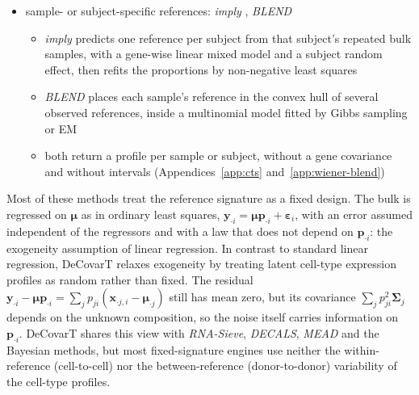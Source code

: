 \documentclass[pdflatex, sn-nature]{sn-jnl}
\theoremstyle{thmstyleone}%
\theoremstyle{thmstyletwo}%
\theoremstyle{thmstylethree}%
\begin{document}
\begin{itemize}
\begin{itemize}
          the reference (Gaussian, log-normal or a single-cell prior)
    \item posterior summaries by Gibbs, Metropolis--Hastings or variational inference;
          none models a \(G\times G\) gene covariance
  \end{itemize}
  \item sample- or subject-specific references:
        \emph{imply} \cite{mengImplyImprovingCelltype2024},
        \emph{BLEND} \cite{huangBLENDProbabilisticCellular2024}
  \begin{itemize}
    \item \emph{imply} predicts one reference per subject from that subject's repeated bulk samples, with a
          gene-wise linear mixed model and a subject random effect, then refits the proportions by non-negative
          least squares
    \item \emph{BLEND} places each sample's reference in the convex hull of several observed references, inside a
          multinomial model fitted by Gibbs sampling or EM
    \item both return a profile per sample or subject, without a gene covariance and without intervals
          (Appendices~\ref{app:cts} and~\ref{app:wiener-blend})
  \end{itemize}

  \end{itemize}
  
Most of these methods treat the reference signature as a fixed design.
The bulk is regressed on \(\boldsymbol{\mu}\) as in ordinary least squares,
\(\boldsymbol{y}_{\cdot i}=\boldsymbol{\mu}\boldsymbol{p}_{\cdot i}+\boldsymbol{\varepsilon}_{i}\),
with an error assumed independent of the regressors and with a law that does not depend on
\(\boldsymbol{p}_{\cdot i}\): the \gls{exogeneity} assumption of linear regression.
In contrast to standard linear regression, DeCovarT relaxes exogeneity by treating latent
cell-type expression profiles as random rather than fixed.
The residual \(\boldsymbol{y}_{\cdot i}-\boldsymbol{\mu}\boldsymbol{p}_{\cdot i}=\sum_{j}p_{ji}(\boldsymbol{x}_{\cdot j,i}-\boldsymbol{\mu}_{\cdot j})\)
still has mean zero, but its covariance \(\sum_{j}p_{ji}^{2}\boldsymbol{\Sigma}_{j}\) depends on the unknown
composition, so the noise itself carries information on \(\boldsymbol{p}_{\cdot i}\).
DeCovarT shares this view with \emph{RNA-Sieve}, \emph{DECALS}, \emph{MEAD} and the Bayesian methods,
but most fixed-signature engines use neither the within-reference (cell-to-cell) nor the
between-reference (donor-to-donor) variability of the cell-type profiles.
\end{document}
